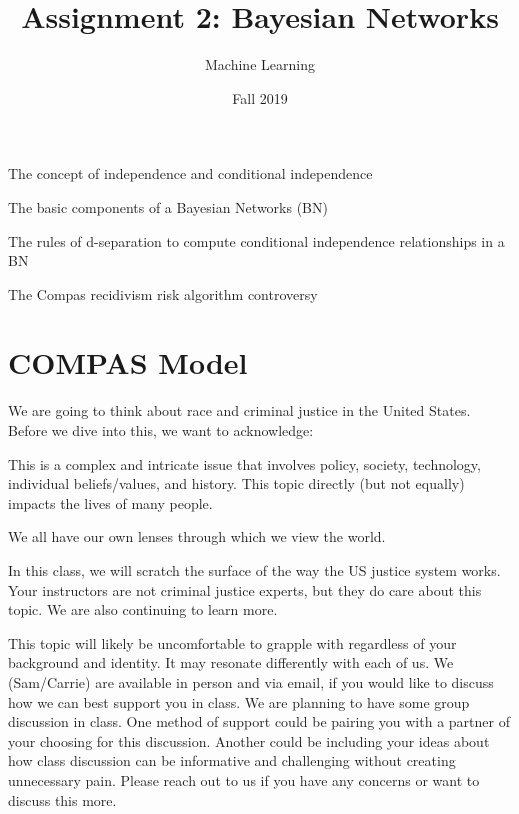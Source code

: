 \documentclass[assignment02_Solutions]{subfiles}
\title{Assignment 2: Bayesian Networks}
\author{Machine Learning}
\date{Fall 2019}
\begin{document}
\maketitle
\thispagestyle{firstpage}


\begin{learningobjectives}
\bi
\item The concept of independence and conditional independence
\item The basic components of a Bayesian Networks (BN)
\item The rules of d-separation to compute conditional independence relationships in a BN
\item The Compas recidivism risk algorithm controversy
\ei
\end{learningobjectives}


\section{COMPAS Model}

\begin{notice}
We are going to think about race and criminal justice in the United States. Before we dive into this, we want to acknowledge:

\bi
\item This is a complex and intricate issue that involves policy, society, technology, individual beliefs/values, and history. This topic directly (but not equally) impacts the lives of many people.
\item We all have our own lenses through which we view the world.
\item In this class, we will scratch the surface of the way the US justice system works. Your instructors are not criminal justice experts, but they do care about this topic. We are also continuing to learn more.
\item This topic will likely be uncomfortable to grapple with regardless of your background and identity. It may resonate differently with each of us. We (Sam/Carrie) are available in person and via email, if you would like to discuss how we can best support you in class. We are planning to have some group discussion in class. One method of support could be pairing you with a partner of your choosing for this discussion. Another could be including your ideas about how class discussion can be informative and challenging without creating unnecessary pain. Please reach out to us if you have any concerns or want to discuss this more.
\ei
\end{notice}
\end{document}
